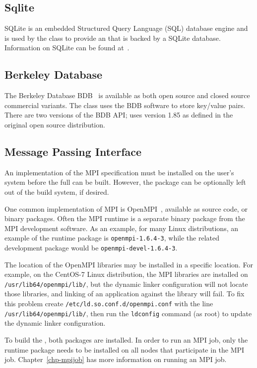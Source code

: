 \subsection{Sqlite}

SQLite is an embedded Structured Query Language (SQL) database engine and is
used by the  class to provide an
 that is backed by a SQLite database. Information
on SQLite can be found at~\cite{sqlite}.

\subsection{Berkeley Database}

The Berkeley Database {BDB}~\cite{berkeleydb} is available as both open source
and closed source commercial variants. The \sname class
 uses the BDB software to store key/value pairs.
There are two versions of the BDB API; \sname uses version 1.85 as defined in
the original open source distribution.

\subsection{Message Passing Interface}

An implementation of the MPI specification must be installed on the user's
system before the full \sname can be built. However, the  package
can be optionally left out of the \sname build system, if desired.

One common implementation of MPI is OpenMPI~\cite{openmpi}, available as source
code, or binary packages. Often the MPI runtime is a separate binary package
from the MPI development software. As an example, for many Linux distributions,
an example of the runtime package is \texttt{openmpi-1.6.4-3}, while
the related development package would be \texttt{openmpi-devel-1.6.4-3}.

The location of the OpenMPI libraries may be installed in a specific location.
For example, on the CentOS-7 Linux distribution, the MPI libraries are installed
on {\tt /usr/lib64/openmpi/lib/}, but the dynamic linker configuration will
not locate those libraries, and linking of an application against the \sname
library will fail. To fix this problem create
{\tt /etc/ld.so.conf.d/openmpi.conf} with the line
{\tt /usr/lib64/openmpi/lib/}, then run the {\tt ldconfig} command (as root)
to update the dynamic linker configuration.

To build the \sname, both packages are installed. In order to run an MPI
job, only the runtime package needs to be installed on all nodes that
participate in the MPI job. Chapter~\ref{chp-mpijob} has more information on
running an MPI job.
